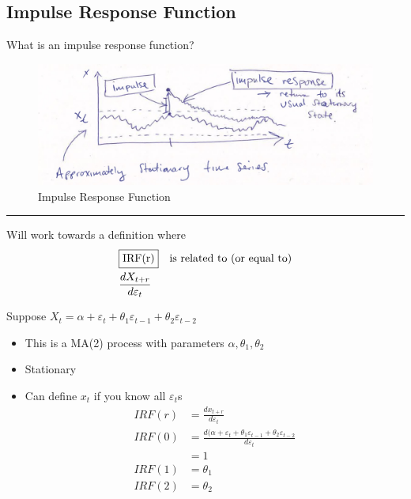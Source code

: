 \subsection{Impulse Response Function}
What is an impulse response function? \\
\begin{figure}[H]
    \centering
    \includegraphics[width=0.8\linewidth]{images/Screenshot 2024-05-21 at 18.13.20.jpg}
    \caption{Impulse Response Function}
\end{figure}


\noindent
\rule{\linewidth}{0.4pt}
Will work towards a definition where 
\begin{align*}
    &\fbox{IRF(r)} \quad \text{is related to (or equal to)} \\
    & \frac{ d X_{t+r} }{ d \varepsilon_t }\\
\end{align*}

Suppose $X_t=\alpha + \varepsilon_t +\theta_1 \varepsilon_{t-1} + \theta_2 \varepsilon_{t-2}$ 
\begin{itemize}
    \item This is a MA(2) process with parameters $\alpha, \theta_1, \theta_2$
    \item Stationary
    \item Can define $x_t$ if you know all $\varepsilon_t$s 
    \begin{align*}
    IRF(r)&=\frac{dx_{t+r}}{d\varepsilon_t}\\
    IRF(0)&= \frac{d(\alpha+\varepsilon_t+\theta_1 \varepsilon_{t-1}+\theta_2 \varepsilon_{t-2}}{d\varepsilon_t}\\ 
    &=1\\
    IRF(1)&=\theta_1\\
    IRF(2)&=\theta_2
    \end{align*}
\end{itemize}

